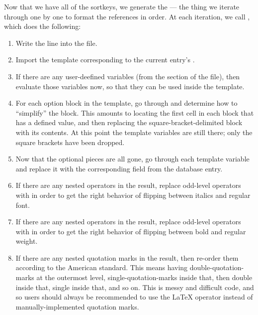 \documentclass[letterpaper,10pt,english]{sphinxmanual}
\begin{document}
Now that we have all of the sortkeys, we generate the  --- the thing we iterate through one by one to format the references in order. At each iteration, we call , which does the following:
\begin{enumerate}
\item {} 
Write the line  into the  file.

\item {} 
Import the template corresponding to the current entry's .

\item {} 
If there are any user-deefined variables (from the  section of the file), then evaluate those variables now, so that they can be used inside the template.

\item {} 
For each option block in the template, go through and determine how to ``simplify'' the block. This amounts to locating the first cell in each block that has a defined value, and then replacing the \code{{[}...{]}} square-bracket-delimited block with its contents. At this point the template variables are still there; only the square brackets have been dropped.

\item {} 
Now that the optional pieces are all gone, go through each template variable and replace it with the corresponding field from the database entry.

\item {} 
If there are any nested  operators in the result, replace odd-level operators with  in order to get the right behavior of flipping between italics and regular font.

\item {} 
If there are any nested  operators in the result, replace odd-level operators with  in order to get the right behavior of flipping between bold and regular weight.

\item {} 
If there are any nested quotation marks in the result, then re-order them according to the American standard. This means having double-quotation-marks at the outermost level, single-quotation-marks inside that, then double inside that, single inside that, and so on. This is messy and difficult code, and so users should always be recommended to use the  LaTeX operator instead of manually-implemented quotation marks.

\end{enumerate}
\end{document}
